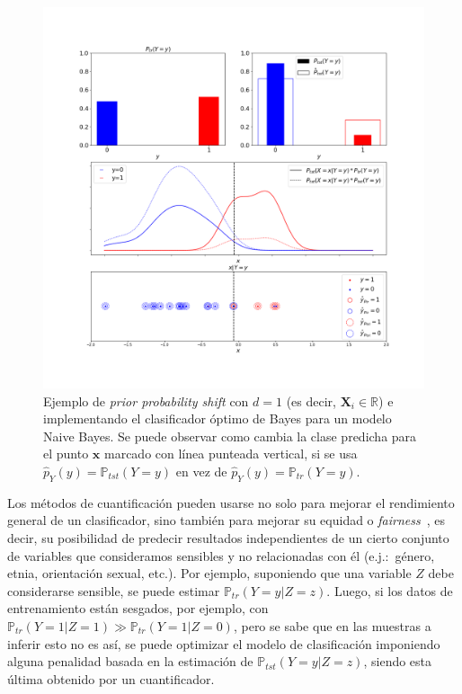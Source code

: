 \begin{figure}[!h]
    \centerline{\includegraphics[width=1.00\textwidth]{../plots_teoria/bayes_classifier.png}}
    \caption{Ejemplo de {\it prior probability shift\/} con $d=1$ (es decir,
    $\boldsymbol{X}_i \in \mathbb{R}$) e implementando el clasificador óptimo de
    Bayes para un modelo Naive Bayes. Se puede observar como cambia la clase
    predicha para el punto $\boldsymbol{x}$ marcado con línea punteada vertical,
    si se usa  $\hat p_Y(y) = \mathbb{P}_{tst}(Y=y)$ en vez de $\hat p_Y(y) =
    \mathbb{P}_{tr}(Y=y)$.}\label{fig:bayes_classifier}
\end{figure}

Los métodos de cuantificación pueden usarse no solo para mejorar el rendimiento
general de un clasificador, sino también para mejorar su equidad o {\it
fairness\/}~\cite{biswas2021ensuring, fabris2023measuring}, es decir, su
posibilidad de predecir resultados independientes de un cierto conjunto de
variables que consideramos sensibles y no relacionadas con él (e.j.:~género,
etnia, orientación sexual, etc.). Por ejemplo, suponiendo que una variable $Z$
debe considerarse sensible, se puede estimar $\mathbb{P}_{tr}(Y=y|Z=z)$. Luego,
si los datos de entrenamiento están sesgados, por ejemplo, con
$\mathbb{P}_{tr}(Y=1|Z=1) \gg \mathbb{P}_{tr}(Y=1|Z=0)$, pero se sabe que en las
muestras a inferir esto no es así, se puede optimizar el modelo de clasificación
imponiendo alguna penalidad basada en la estimación de
$\mathbb{P}_{tst}(Y=y|Z=z)$, siendo esta última obtenido por un cuantificador.
